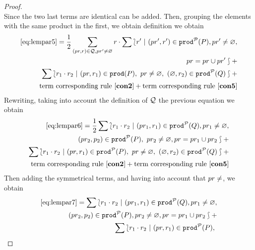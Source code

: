 \begin{proof}
\begin{equation}
    \end{equation}
    Since the two last terms are identical can be added. Then,
    grouping the elements with the same product in the first, we obtain
    definition we obtain
    \begin{equation}\label{eq:lempar6}
      \begin{split}
        \eqref{eq:lempar5} =
        \frac{1}{2}\sum_{(pr,r)\in{\cal Q}, pr'\neq\varnothing} r\cdot
        \sum\lbag r'\ |\
        (pr', r')\in\mathtt{prod}^{\cal P}(P), pr'\neq\varnothing,\\
        pr=pr\cup pr'\rbag +\\
        \sum\lbag  r_{1}\cdot r_{2}\ |\
        (pr,r_{1})\in\mathtt{prod}(P),\ pr\neq\varnothing,\
        (\varnothing, r_{2})\in \mathtt{prod}^{\cal P}(Q)\rbag+\\
        \mbox{term corresponding rule \ensuremath{\mathbf{[con2]}}} + \mbox{term corresponding rule \ensuremath{\mathbf{[con5]}}}
      \end{split}
    \end{equation}
    Rewriting, taking into account the definition of \({\cal Q}\) the
    previous equation we obtain
    \begin{equation}\label{eq:lempar7}
      \begin{split}
        \eqref{eq:lempar6} =
        \frac{1}{2}\sum\lbag r_{1}\cdot r_{2}\ |\ (pr_{1},r_{1})\in\prodp(Q),
        pr_{1}\neq\emptyset,\\ (pr_{2},p_{2})\in\prodp(P),\
        pr_{2}\neq\emptyset,pr = pr_{1}\cup pr_{2}\rbag +\\
        \sum\lbag  r_{1}\cdot r_{2}\ |\
        (pr,r_{1})\in\prodp(P),\ pr\neq\emptyset,\
        (\emptyset,r_{2})\in\prodp(Q)\rbag+\\
        \mbox{term corresponding rule \nombreRegla{con2}} + \mbox{term corresponding rule \nombreRegla{con5}}
      \end{split}
    \end{equation}
    Then adding the symmetrical terms, and having into account that
    $pr\neq\empty$, we obtain
    \begin{equation}\label{eq:lempar8}
      \begin{split}
        \eqref{eq:lempar7} =
        \sum\lbag r_{1}\cdot r_{2}\ |\ (pr_{1},r_{1})\in\prodp(Q),
        pr_{1}\neq\emptyset,\\ (pr_{2},p_{2})\in\prodp(P),
        pr_{2}\neq\emptyset, pr = pr_{1}\cup pr_{2}\rbag +\\
        \sum\lbag  r_{1}\cdot r_{2}\ |\
        (pr,r_{1})\in\prodp(P),\

\end{split}
\end{equation}
\end{proof}
